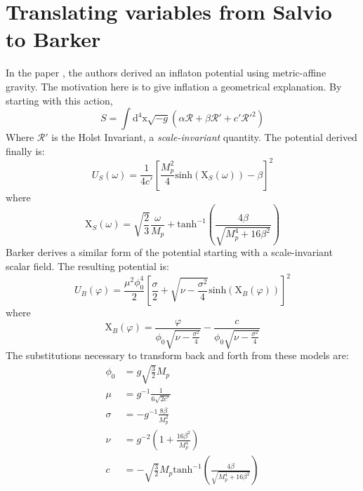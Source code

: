 \documentclass[aps,prd,reprint,preprintnumbers,showpacs,floatfix,nofootinbib,superscript address]{revtex4-2}
\begin{document}
\section{Translating variables from Salvio to Barker} \label{Appendix A}
In the paper \cite{Salvio_2022}, the authors derived an inflaton potential using metric-affine gravity. The motivation here is to give inflation a geometrical explanation. 
By starting with this action, 
\begin{equation}
    S = \int \text{d}^4\text{x} \sqrt{-g} (\alpha \mathcal{R} + \beta \mathcal{R}' + c' \mathcal{R}'^{2})
\end{equation}
Where $\mathcal{R}'$ is the Holst Invariant, a \textit{scale-invariant} quantity. The potential derived finally is: 
\begin{equation}
    U_S(\omega) = \frac{1}{4 c'} \left[ \frac{M_{p}^{2}}{4} \text{sinh}(\text{X}_S(\omega)) - \beta  \right]^2
\end{equation}
where
\begin{equation}
    \text{X}_S(\omega) = \sqrt{\frac{2}{3}} \frac{\omega}{M_{p}} + \text{tanh}^{-1} \left(\frac{4 \beta}{\sqrt{M_{p}^{4}+16 \beta^2}} \right)
\end{equation}
Barker \cite{barker2024poincaregaugetheoryconformal} derives a similar form of the potential starting with a scale-invariant scalar field. The resulting potential is:
\begin{equation}
    U_B(\varphi) = \frac{\mu^2 \phi_{0}^{4}}{2} \left[ \frac{\sigma}{2} + \sqrt{\nu - \frac{\sigma^2}{4}} \text{sinh}\left( \text{X}_B(\varphi) \right)  \right]^2
\end{equation}
where
\begin{equation}
    \text{X}_B(\varphi) =  \frac{\varphi}{\phi_0 \sqrt{\nu - \frac{\sigma^2}{4}}} - \frac{c}{\phi_0 \sqrt{\nu - \frac{\sigma^2}{4}}}
\end{equation}
The substitutions necessary to transform back and forth from these models are: 
\begin{align}
    \phi_0 &= g \sqrt{\frac{3}{2}} M_p  \nonumber \\
    \mu &= g^{-1} \frac{1}{6 \sqrt{2 c'}}  \nonumber \\
    \sigma &= - g^{-1} \frac{8 \beta}{M_{p}^{2}}  \nonumber \\
    \nu &= g^{-2} \left( 1 + \frac{16 \beta^2}{M_{p}^{4}} \right) \nonumber \\
    c  &= -\sqrt{\frac{3}{2}} M_{p} \text{tanh}^{-1} \left(\frac{4 \beta}{\sqrt{M_{p}^{4}+16 \beta^2}} \right)
\end{align}
\end{document}
